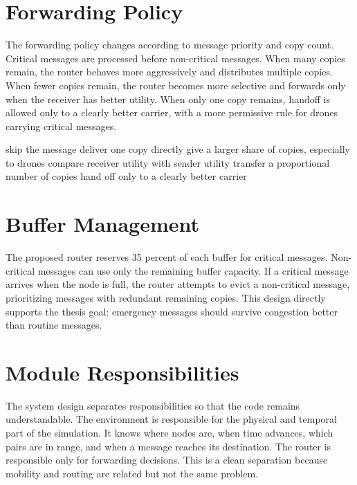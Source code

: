 \section{Forwarding Policy}
The forwarding policy changes according to message priority and copy count. Critical messages are processed before non-critical messages. When many copies remain, the router behaves more aggressively and distributes multiple copies. When fewer copies remain, the router becomes more selective and forwards only when the receiver has better utility. When only one copy remains, handoff is allowed only to a clearly better carrier, with a more permissive rule for drones carrying critical messages.

\begin{algorithm}[h!]
\caption{Spatio-Semantic forwarding decision}
\begin{algorithmic}[1]
		\State skip the message
	\EndIf
		\State deliver one copy directly
		\State give a larger share of copies, especially to drones
		\State compare receiver utility with sender utility
			\State transfer a proportional number of copies
		\EndIf
		\State hand off only to a clearly better carrier
	\EndIf
\EndFor
\end{algorithmic}
\end{algorithm}

\section{Buffer Management}
The proposed router reserves 35 percent of each buffer for critical messages. Non-critical messages can use only the remaining buffer capacity. If a critical message arrives when the node is full, the router attempts to evict a non-critical message, prioritizing messages with redundant remaining copies. This design directly supports the thesis goal: emergency messages should survive congestion better than routine messages.

\section{Module Responsibilities}
The system design separates responsibilities so that the code remains understandable. The environment is responsible for the physical and temporal part of the simulation. It knows where nodes are, when time advances, which pairs are in range, and when a message reaches its destination. The router is responsible only for forwarding decisions. This is a clean separation because mobility and routing are related but not the same problem.

